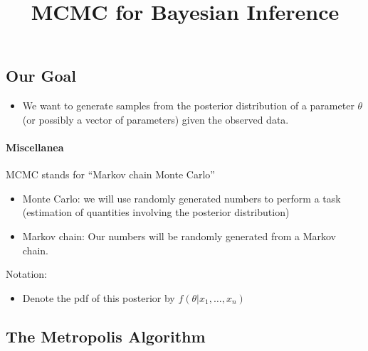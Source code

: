 \documentclass[]{article}
\title{MCMC for Bayesian Inference}
\author{}
\date{}
\providecommand{\tightlist}{%
  \setlength{\itemsep}{0pt}\setlength{\parskip}{0pt}}
\let\oldparagraph\paragraph
\renewcommand{\paragraph}[1]{\oldparagraph{#1}\mbox{}}
\begin{document}
\maketitle

\def\simiid{\stackrel{{\mbox{\text{\tiny i.i.d.}}}}{\sim}}

\subsection{Our Goal}\label{our-goal}

\begin{itemize}
\tightlist
\item
  We want to generate samples from the posterior distribution of a
  parameter \(\theta\) (or possibly a vector of parameters) given the
  observed data.
\end{itemize}

\paragraph{Miscellanea}\label{miscellanea}

MCMC stands for ``Markov chain Monte Carlo''

\begin{itemize}
\tightlist
\item
  Monte Carlo: we will use randomly generated numbers to perform a task
  (estimation of quantities involving the posterior distribution)
\item
  Markov chain: Our numbers will be randomly generated from a Markov
  chain.
\end{itemize}

Notation:

\begin{itemize}
\tightlist
\item
  Denote the pdf of this posterior by \(f(\theta | x_1, \ldots, x_n)\)
\end{itemize}

\subsection{The Metropolis Algorithm}\label{the-metropolis-algorithm}
\end{document}
